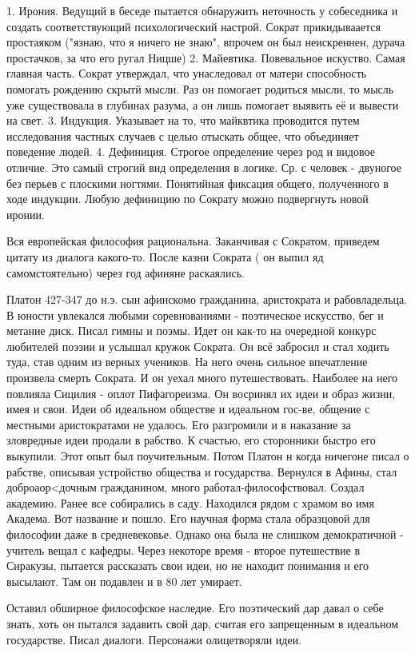 	1. Ирония. Ведущий в беседе пытается обнаружить неточность у собеседника и создать соответствующий психологический настрой. 
	Сократ прикидываается простаяком ("язнаю, что я ничего не знаю", впрочем он был неискреннен, дурача простачков, за что его ругал Ницше)
	2. Майевтика. Повевальное искуство. Самая главная часть. Сократ утверждал, что унаследовал от матери способность помогать рождению скрытй мысли. 
	Раз он помогает родиться мысли, то мысль уже существовала в глубинах разума, а он лишь помогает выявить её и вывести на свет.
	3. Индукция. Указывает на то, что майквтика проводится путем исследования частных случаев с целью отыскать общее, что объединяет поведение людей.
	4. Дефиниция. Строгое определение через род и видовое отличие. Это самый строгий вид определения в логике. Ср. с человек - двуногое без перьев с плоскими ногтями. 
	Понятийная фиксация общего, полученного в ходе индукции. Любую дефиницию по Сократу можно подвергнуть новой иронии.

Вся европейская философия рациональна.
Заканчивая с Сократом, приведем цитату из диалога какого-то.
После казни Сократа ( он выпил яд самомстоятельно) через год афиняне раскаялись.

Платон
427-347 до н.э.  сын афинскомо гражданина, аристократа и рабовладельца. В юности увлекался любыми соревнованиями - поэтическое искусство, бег и метание диск. Писал гимны и поэмы. 
Идет он как-то на очередной конкурс любителей поэзии и услышал кружок Сократа. Он всё забросил и стал ходить туда, став одним из верных учеников. На него очень сильное впечатление произвела смерть Сократа. 
И он уехал много путешествовать. Наиболее на него повлияла Сицилия - оплот Пифагореизма. 
Он восринял их идеи и образ жизни, имея и свои. Идеи об идеальном обществе и идеальном гос-ве, общение с местными аристократами не удалось. 
Его разгромили и в наказание за зловредные идеи продали в рабство. К счастью, его сторонники быстро его выкупили. Этот опыт был поучительным. 
Потом Платон н когда ничегоне писал о рабстве, описывая устройство общества и государства. Вернулся в Афины, стал доброаор<дочным гражданином, много работал-философствовал. 
Создал академию. Ранее все собирались в саду. Находился рядом с храмом во имя Академа. Вот название и пошло. Его научная форма стала образцовой для философии даже в средневековье. 
Однако она была не слишком демократичной - учитель вещал с кафедры. Через некоторе время - второе путешествие в Сиракузы, пытается рассказать свои идеи, но не находит понимания и его высылают. Там он подавлен и в 80 лет умирает.

Оставил обширное философское наследие. Его поэтический дар давал о себе знать, хоть он пытался задавить свой дар, считая его запрещенным в идеальном государстве. Писал диалоги. Персонажи олицетворяли идеи.
